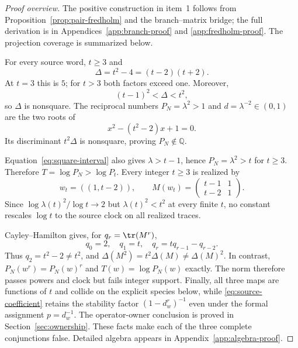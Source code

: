 \begin{proof}[Proof overview]
The positive construction in item~1 follows from
Proposition~\ref{prop:pair-fredholm} and the branch--matrix bridge; the full
derivation is in Appendices~\ref{app:branch-proof} and
\ref{app:fredholm-proof}.  The projection coverage is summarized below.

For every source word, $t\ge3$ and
\begin{equation}
  \Delta=t^2-4=(t-2)(t+2).
  \label{eq:delta-factorization}
\end{equation}
At $t=3$ this is $5$; for $t>3$ both factors exceed one.  Moreover,
\begin{equation}
  (t-1)^2<\Delta<t^2,
  \label{eq:square-interval}
\end{equation}
so $\Delta$ is nonsquare.  The reciprocal numbers $P_N=\lambda^2>1$ and
$d=\lambda^{-2}\in(0,1)$ are the two roots of
\begin{equation}
  x^2-(t^2-2)x+1=0.
  \label{eq:norm-polynomial}
\end{equation}
Its discriminant $t^2\Delta$ is nonsquare, proving $P_N\notin\mathbb Q$.

Equation~\eqref{eq:square-interval} also gives $\lambda>t-1$, hence
$P_N=\lambda^2>t$ for $t\ge3$.  Therefore $T=\log P_N>\log P_t$.  Every
integer $t\ge3$ is realized by
\begin{equation}
  w_t=((1,t-2)),\qquad
  M(w_t)=\begin{pmatrix}t-1&1\\t-2&1\end{pmatrix}.
  \label{eq:trace-family}
\end{equation}
Since $\log\lambda(t)^2/\log t\to2$ but $\lambda(t)^2<t^2$ at every finite
$t$, no constant rescales $\log t$ to the source clock on all realized
traces.

Cayley--Hamilton gives, for $q_r=\tr(M^r)$,
\begin{equation}
  q_0=2,\quad q_1=t,\quad q_r=tq_{r-1}-q_{r-2}.
  \label{eq:trace-recurrence}
\end{equation}
Thus $q_2=t^2-2\ne t^2$, and
$\Delta(M^2)=t^2\Delta(M)\ne\Delta(M)^2$.  In contrast,
$P_N(w^r)=P_N(w)^r$ and $T(w)=\log P_N(w)$ exactly.  The norm therefore
passes powers and clock but fails integer support.  Finally, all three maps
are functions of $t$ and collide on the explicit species below, while
\eqref{eq:source-coefficient} retains the stability factor
$(1-d_w^r)^{-1}$ even under the formal assignment $p=d_w^{-1}$.  The
operator-owner conclusion is proved in Section~\ref{sec:ownership}.  These
facts make each of the three complete conjunctions false.  Detailed algebra
appears in Appendix~\ref{app:algebra-proof}.
\end{proof}


